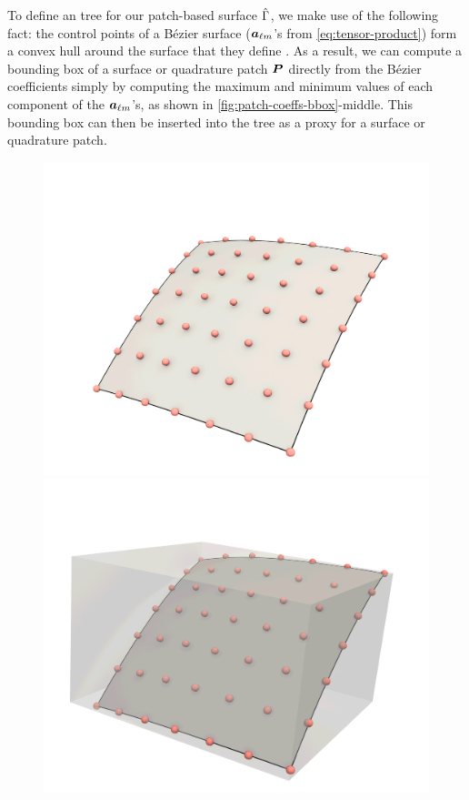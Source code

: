 To define an \aabb tree for our patch-based surface $\hat{\Gamma}$, we make use of the following fact: the control points of a B\'ezier surface ($\bm{a}_{\ell m}$'s from \cref{eq:tensor-product}) form a convex hull around the surface that they define \cite{F}.
As a result, we can compute a bounding box of a surface or quadrature patch ${\bm{P}}$ directly from the B\'ezier coefficients simply by computing the maximum and minimum values of each component of the $\bm{a}_{\ell m}$'s, as shown in \cref{fig:patch-coeffs-bbox}-middle.
This bounding box can then be inserted into the \aabb tree as a proxy for a surface or quadrature patch.
\begin{figure}[!htb]
  \centering
  \begin{minipage}{.33\textwidth}
      \includegraphics[width=\linewidth]{figs/patch_with_coeffs.png}
  \end{minipage}\hfill
  \begin{minipage}{.33\textwidth}
    \includegraphics[width=\linewidth]{figs/patch_with_coeffs_bbox.png}

\end{minipage}
\end{figure}
